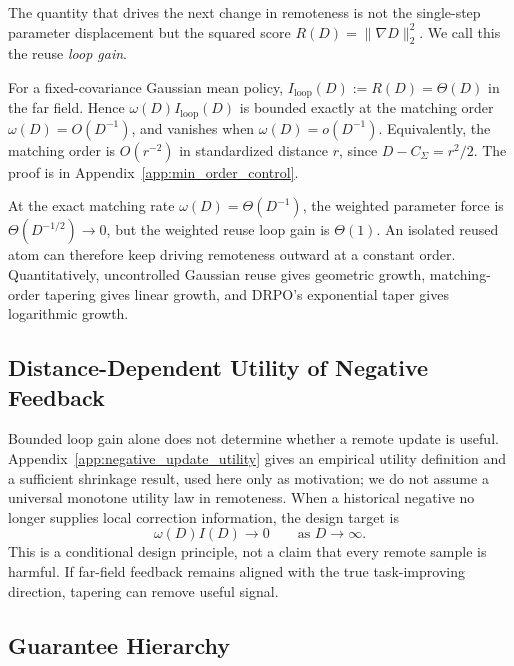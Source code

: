 The quantity that drives the next change in remoteness is not the
single-step parameter displacement but the squared score
\(R(D)=\|\nabla D\|_2^2\). We call this the reuse \emph{loop gain}.

\begin{proposition}
\label{prop:loop_gain_order}
For a fixed-covariance Gaussian mean policy,
\(I_{\mathrm{loop}}(D):=R(D)=\Theta(D)\) in the far field. Hence
\(\omega(D)I_{\mathrm{loop}}(D)\) is bounded exactly at the matching
order \(\omega(D)=O(D^{-1})\), and vanishes when
\(\omega(D)=o(D^{-1})\). Equivalently, the matching order is
\(O(r^{-2})\) in standardized distance \(r\), since
\(D-C_\Sigma=r^2/2\). The proof is in
Appendix~\ref{app:min_order_control}.
\end{proposition}

At the exact matching rate \(\omega(D)=\Theta(D^{-1})\), the weighted
parameter force is \(\Theta(D^{-1/2})\to0\), but the weighted reuse loop gain
is \(\Theta(1)\). An isolated reused atom can therefore keep driving
remoteness outward at a constant order. Quantitatively, uncontrolled Gaussian
reuse gives geometric growth, matching-order tapering gives linear growth,
and DRPO's exponential taper gives logarithmic growth.

\subsection{Distance-Dependent Utility of Negative Feedback}
\label{subsec:distance_dependent_utility}

Bounded loop gain alone does not determine whether a remote update is useful.
Appendix~\ref{app:negative_update_utility} gives an empirical utility
definition and a sufficient shrinkage result, used here only as motivation;
we do not assume a universal monotone utility law in remoteness. When a
historical negative no longer supplies local correction information, the
design target is
\begin{equation}
    \omega(D) I(D)
    \longrightarrow 0
    \qquad
    \text{as }
    D\longrightarrow\infty .
    \label{eq:far_field_residual_vanishes}
\end{equation}
This is a conditional design principle, not a claim that every remote
sample is harmful. If far-field feedback remains aligned with the true
task-improving direction, tapering can remove useful signal.

\subsection{Guarantee Hierarchy}
\label{sec:exponential_taper}

